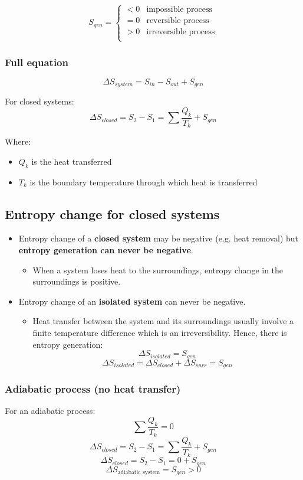 \documentclass[11pt]{article}
\begin{document}
\begin{displaymath}
S_{gen} =
\begin{cases}
< 0 & \text{impossible process} \\
= 0 & \text{reversible process} \\
> 0 & \text{irreversible process} \\
\end{cases}
\end{displaymath}
\subsubsection{Full equation}
\label{sec:orgb34e463}
\[\Delta S_{system} = S_{in} - S_{out} + S_{gen}\]

For closed systems:
\[\Delta S_{closed} = S_2 - S_1 = \sum \frac{Q_k}{T_k} + S_{gen}\]

Where:
\begin{itemize}
\item \(Q_k\) is the heat transferred
\item \(T_k\) is the boundary temperature through which heat is transferred
\end{itemize}
\subsection{Entropy change for closed systems}
\label{sec:org32e9cb9}
\begin{itemize}
\item Entropy change of a \textbf{closed system} may be negative (e.g. heat removal) but \textbf{entropy generation can never be negative}.
\begin{itemize}
\item When a system loses heat to the surroundings, entropy change in the surroundings is positive.
\end{itemize}
\item Entropy change of an \textbf{isolated system} can never be negative.
\begin{itemize}
\item Heat transfer between the system and its surroundings usually involve a finite temperature difference which is an irreversibility. Hence, there is entropy generation:
\[\Delta S_{isolated} = S_{gen}\]
\[\Delta S_{isolated} = \Delta S_{closed} + \Delta S_{surr} = S_{gen}\]
\end{itemize}
\end{itemize}
\subsubsection{Adiabatic process (no heat transfer)}
\label{sec:orgedd3cbf}
For an adiabatic process:
\[\sum \frac{Q_k}{T_k} = 0\]
\[\Delta S_{closed} = S_2 - S_1 = \sum \frac{Q_k}{T_k} + S_{gen}\]
\[\Delta S_{closed} = S_2 - S_1 = 0 + S_{gen}\]
\[\Delta S_{\text{adiabatic system}} = S_{gen} > 0\]
\end{document}

